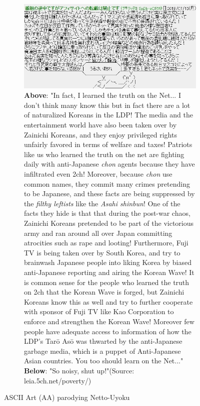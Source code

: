 \documentclass[10pt,british,A4paper,oneside]{memoir}
\begin{document}
\begin{figure}[!htb]
 \centering
 \begin{subfigure}[b]{0.95\textwidth}
 \includegraphics[width=\textwidth]{images/2channel/anti-aa.jpg}
 \caption*{\textbf{Above}: "In fact, I learned the truth on the Net... I don’t think many know this but in fact there are a lot of naturalized Koreans in the LDP! The media and the entertainment world have also been taken over by Zainichi Koreans, and they enjoy privileged rights unfairly favored in terms of welfare and taxes! Patriots like us who learned the truth on the net are fighting daily with anti-Japanese \textit{chon} agents because they have infiltrated even 2ch! Moreover, because \textit{chon} use common names, they commit many crimes pretending to be Japanese, and these facts are being suppressed by the \textit{filthy leftists} like the \textit{Asahi shinbun}! One of the facts they hide is that that during the post-war chaos, Zainichi Koreans pretended to be part of the victorious army and ran around all over Japan committing atrocities such as rape and looting! Furthermore, Fuji TV is being taken over by South Korea, and try to brainwash Japanese people into liking Korea by biased anti-Japanese reporting and airing the Korean Wave! It is common sense for the people who learned the truth on 2ch that the Korean Wave is forged, but Zainichi Koreans know this as well and try to further cooperate with sponsor of Fuji TV like Kao Corporation to enforce and strengthen the Korean Wave! Moreover few people have adequate access to information of how the LDP’s Tarō Asō was thwarted by the anti-Japanese garbage media, which is a puppet of Anti-Japanese Asian countries. You too should learn on the Net..." \textbf{Below}: "So noisy, shut up!"\newline (Source: leia.5ch.net/poverty/)}
 \label{fig:aajp}
 \end{subfigure}
 \caption{ASCII Art (AA) parodying Netto-Uyoku}\label{fig:aa}
\end{figure}
\end{document}
